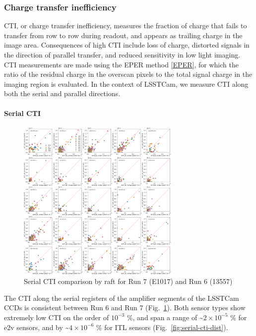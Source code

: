 \subsubsection{Charge transfer
inefficiency}\label{charge-transfer-inefficiency}

CTI, or charge transfer inefficiency, measures the fraction of charge that fails to transfer from row to row during readout, and appears as trailing charge in the image area. Consequences of high CTI include loss of charge, distorted signals in the direction of parallel transfer, and reduced sensitivity in low light imaging. CTI measurements are made using the EPER method \hyperref[EPER]{{[}EPER{]}}, for which the ratio of the residual charge in the overscan pixels to the total signal charge in the imaging region is evaluated. In the context of LSSTCam, we measure CTI along both the serial and parallel directions.

\paragraph{Serial CTI}\label{serial-cti}

\begin{figure}[H]
\begin{centering}
\includegraphics[width=0.7\textwidth]{sections/figures/baselineCharacterization/13557_E1071_SCTI_EF_43.png}
	\caption{Serial CTI comparison by raft for Run 7 (E1017) and Run 6 (13557)\label{fig:serial-cti}}
\end{centering}
\end{figure}

The CTI along the serial registers of the amplifier segments of the LSSTCam CCDs is consistent between Run 6 and
Run 7 (Fig.~\ref{fig:serial-cti}). Both sensor types show extremely low CTI on the order of $10^{-3}$ \%,
and span a range  of \textasciitilde$2 \times 10^{-5}$ \% for e2v sensors, and
by \textasciitilde$4 \times 10^{-6}$  \% for ITL sensors (Fig.~\ref{fig:serial-cti-dist}).

